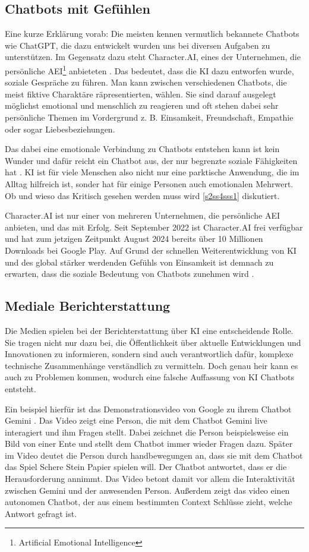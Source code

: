 	\subsection{Chatbots mit Gefühlen}
	Eine kurze Erklärung vorab: Die meisten kennen vermutlich bekannete Chatbots wie ChatGPT, die dazu
	entwickelt wurden uns bei diversen Aufgaben zu unterstützen. Im Gegensatz dazu steht Character.AI, 
	eines der Unternehmen, die \glqq{}persönliche\grqq{} AEI\footnote{Artificial Emotional Intelligence} 
	anbieteten \cite{cAI24}. Das bedeutet, dass die KI dazu entworfen wurde, soziale Gespräche zu führen.
	Man kann zwischen verschiedenen Chatbots, die meist fiktive Charaktäre räpresentierten, wählen. Sie
	sind darauf ausgelegt möglichst emotional und menschlich zu reagieren und oft stehen dabei sehr 
	persönliche Themen im Vordergrund z. B. Einsamkeit, Freundschaft, Empathie oder sogar Liebesbeziehungen. 
	
	Das dabei eine emotionale Verbindung zu Chatbots entstehen kann ist kein Wunder und dafür reicht ein 
	Chatbot aus, der nur begrenzte soziale Fähigkeiten hat \cite{chen24}. KI ist für viele Menschen also 
	nicht nur eine parktische Anwendung, die im Alltag hilfreich ist, sonder hat für einige Personen auch
	emotionalen Mehrwert. Ob und wieso das Kritisch gesehen werden muss wird \ref{s2ss4sss1} diskutiert.  

	Character.AI ist nur einer von mehreren Unternehmen, die persönliche AEI anbieten, und das mit Erfolg. 
	Seit September 2022 ist Character.AI frei verfügbar und hat zum jetzigen Zeitpunkt August 2024 bereits
	über 10 Millionen Downloads bei Google Play. Auf Grund der schnellen Weiterentwicklung von KI und des 
	global stärker werdenden Gefühls von Einsamkeit ist demnach zu erwarten, dass die soziale Bedeutung 
	von Chatbots zunehmen wird \cite{chen24}. 
	
	
	\clearpage		
	\subsection{Mediale Berichterstattung}
	Die Medien spielen bei der Berichterstattung über KI eine entscheidende Rolle. Sie tragen nicht nur dazu
	bei, die Öffentlichkeit über aktuelle Entwicklungen und Innovationen zu informieren, sondern sind auch 
	verantwortlich dafür, komplexe technische Zusammenhänge verständlich zu vermitteln. Doch genau heir kann
	es auch zu Problemen kommen, wodurch eine falsche Auffassung von KI Chatbots entsteht.

	Ein beispiel hierfür ist das Demonstrationsvideo von Google zu ihrem Chatbot Gemini \cite{gminiDemo2023}. 
	Das Video zeigt eine Person, die mit dem Chatbot Gemini live interagiert und ihm Fragen stellt. Dabei
	zeichnet die Person beispielsweise ein Bild von einer Ente und stellt dem Chatbot immer wieder Fragen dazu.
	Später im Video deutet die Person durch handbewegungen an, dass sie mit dem Chatbot das Spiel \glqq{}Schere
	Stein Papier\grqq{} spielen will. Der Chatbot antwortet, dass er die Herausforderung annimmt. Das Video
	betont damit vor allem die Interaktivität zwischen Gemini und der anwesenden Person. Außerdem zeigt das
	video einen autonomen Chatbot, der aus einem bestimmten Context Schlüsse zieht, welche Antwort gefragt ist. 

